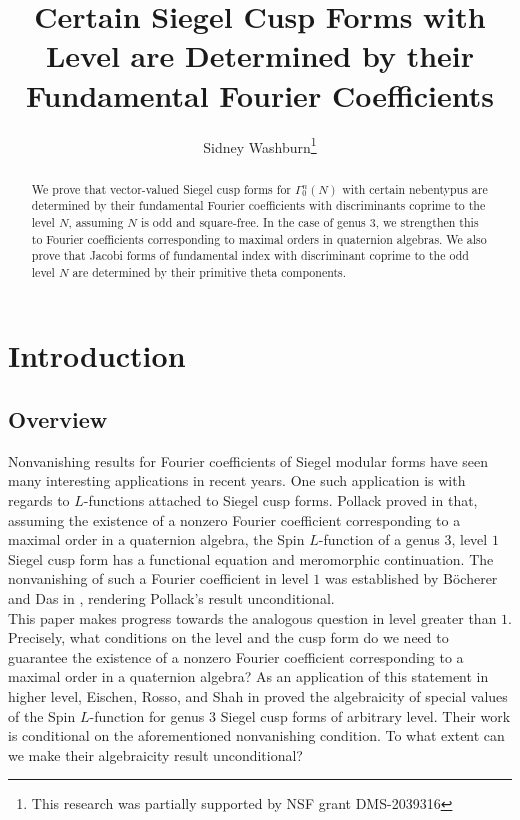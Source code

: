 \documentclass[11pt]{article}
\title{Certain Siegel Cusp Forms with Level are Determined by their Fundamental Fourier Coefficients}
\author{Sidney Washburn\footnote{This research was partially supported by NSF grant DMS-2039316} }
\date{}
\theoremstyle{definition}
\theoremstyle{remark}
\begin{document}
\maketitle 

\begin{abstract}
    We prove that vector-valued Siegel cusp forms for $\Gamma_0^n(N)$ with certain nebentypus are determined by their fundamental Fourier coefficients with discriminants coprime to the level $N$, assuming $N$ is odd and square-free. In the case of genus $3$, we strengthen this to Fourier coefficients corresponding to maximal orders in quaternion algebras. We also prove that Jacobi forms of fundamental index with discriminant coprime to the odd level $N$ are determined by their primitive theta components. 
\end{abstract}

\section{Introduction}

\subsection{Overview}

Nonvanishing results for Fourier coefficients of Siegel modular forms have seen many interesting applications in recent years. One such application is with regards to $L$-functions attached to Siegel cusp forms. Pollack proved in \cite{Pollack} that, assuming the existence of a nonzero Fourier coefficient corresponding to a maximal order in a quaternion algebra, the Spin $L$-function  of a genus $3$, level $1$ Siegel cusp form has a functional equation and meromorphic continuation. The nonvanishing of such a Fourier coefficient in level $1$ was established by B\"ocherer and Das in \cite{BD}, rendering Pollack's result unconditional. \\

This paper makes progress towards the analogous question in level greater than $1$. Precisely, what conditions on the level and the cusp form do we need to guarantee the existence of a nonzero Fourier coefficient corresponding to a maximal order in a quaternion algebra? As an application of this statement in higher level, Eischen, Rosso, and Shah in \cite{eischen} proved the algebraicity of special values of the Spin $L$-function for genus $3$ Siegel cusp forms of arbitrary level. Their work is conditional on the aforementioned nonvanishing condition. To what extent can we make their algebraicity result unconditional? \\
\end{document}
